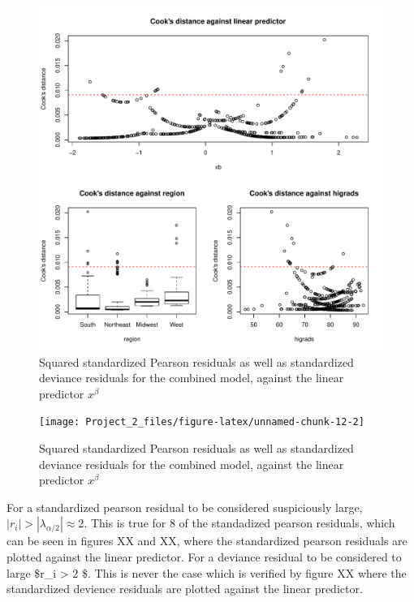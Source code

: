 \documentclass[a4paper]{article}
\begin{document}
\begin{figure}[h]
\includegraphics{Project_2_files/figure-latex/unnamed-chunk-12-1} \caption{\label{fig:residuals_combined}Squared standardized Pearson residuals as well as standardized deviance residuals for the combined model, against the linear predictor $x^{\beta}$}\label{fig:unnamed-chunk-121}
\end{figure}
\begin{figure}[h]
\texttt{[image: Project\_2\_files/figure-latex/unnamed-chunk-12-2]} \caption{\label{fig:residuals_combined}Squared standardized Pearson residuals as well as standardized deviance residuals for the combined model, against the linear predictor $x^{\beta}$}\label{fig:unnamed-chunk-122}
\end{figure}

For a standardized pearson residual to be considered suspiciously large,
\(|r_i| > |\lambda_{\alpha/2}| ≈ 2\). This is true for 8 of the
standadized pearson residuals, which can be seen in figures XX and XX,
where the standardized pearson residuals are plotted against the linear
predictor. For a deviance residual to be considered to large
\$\textbar{}r\_i\textbar{} \textgreater{} 2 \$. This is never the case
which is verified by figure XX where the standardized devience residuals
are plotted against the linear predictor.
\end{document}
